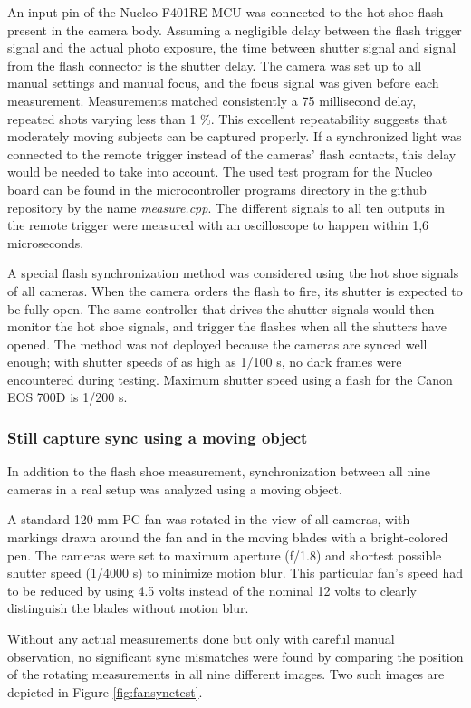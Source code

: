 An input pin of the Nucleo-F401RE MCU was connected to the hot shoe flash present in the camera body.
Assuming a negligible delay between the flash trigger signal and the actual photo exposure, the time between shutter signal and signal from the flash connector is the shutter delay.
The camera was set up to all manual settings and manual focus, and the focus signal was given before each measurement.
Measurements matched consistently a 75 millisecond delay, repeated shots varying less than 1 \%.
This excellent repeatability suggests that moderately moving subjects can be captured properly.
If a synchronized light was connected to the remote trigger instead of the cameras' flash contacts, this delay would be needed to take into account.
The used test program for the Nucleo board can be found in the microcontroller programs directory in the github repository by the name \emph{measure.cpp}.
The different signals to all ten outputs in the remote trigger were measured with an oscilloscope to happen within 1,6 microseconds.

A special flash synchronization method was considered using the hot shoe signals of all cameras.
When the camera orders the flash to fire, its shutter is expected to be fully open.
The same controller that drives the shutter signals would then monitor the hot shoe signals, and trigger the flashes when all the shutters have opened.
The method was not deployed because the cameras are synced well enough; with shutter speeds of as high as 1/100 s, no dark frames were encountered during testing.
Maximum shutter speed using a flash for the Canon EOS 700D is 1/200 s.

\subsubsection{Still capture sync using a moving object}

In addition to the flash shoe measurement, synchronization between all nine cameras in a real setup was analyzed using a moving object.

A standard 120 mm PC fan was rotated in the view of all cameras, with markings drawn around the fan and in the moving blades with a bright-colored pen.
The cameras were set to maximum aperture (f/1.8) and shortest possible shutter speed (1/4000 s) to minimize motion blur.
This particular fan's speed had to be reduced by using 4.5 volts instead of the nominal 12 volts to clearly distinguish the blades without motion blur.

Without any actual measurements done but only with careful manual observation, no significant sync mismatches were found by comparing the position of the rotating measurements in all nine different images.
Two such images are depicted in Figure \ref{fig:fansynctest}.

